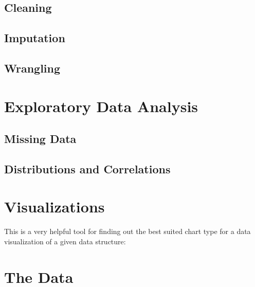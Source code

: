 \documentclass[
  letterpaper,
  DIV=11,
  numbers=noendperiod]{scrreprt}
\begin{document}
\hypertarget{cleaning}{%
\section{Cleaning}\label{cleaning}}

\hypertarget{imputation}{%
\section{Imputation}\label{imputation}}

\hypertarget{wrangling}{%
\section{Wrangling}\label{wrangling}}


\hypertarget{exploratory-data-analysis}{%
\chapter{Exploratory Data Analysis}\label{exploratory-data-analysis}}

\hypertarget{missing-data}{%
\section{Missing Data}\label{missing-data}}

\hypertarget{distributions-and-correlations}{%
\section{Distributions and
Correlations}\label{distributions-and-correlations}}


\hypertarget{visualizations}{%
\chapter{Visualizations}\label{visualizations}}

This is a very helpful tool for finding out the best suited chart type
for a data visualization of a given data structure:


\hypertarget{the-data-1}{%
\chapter{The Data}\label{the-data-1}}
\end{document}
